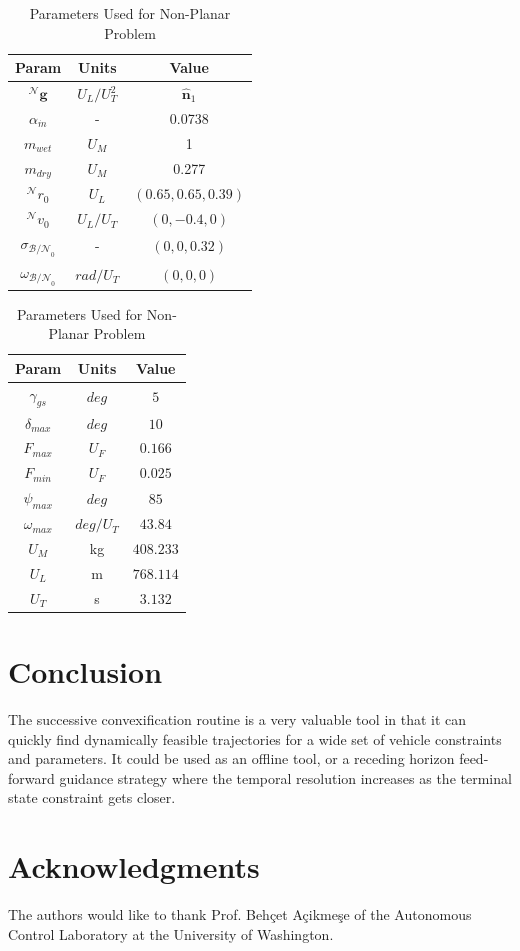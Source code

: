 \documentclass[conf]{new-aiaa}
\begin{document}
\begin{table}[ht]
  \caption{Parameters Used for Non-Planar Problem}
  \centering 
  \begin{tabular}{c c c} 
    \hline\hline
    Param & Units & Value \\ [0.5ex] 
    \hline 
    $^\mathcal{N}\mathbf{g}$ 		& $U_L/U_T^2$ 	& $\hat{\mathbf{n}}_1$  \\ 
    $\alpha_{\dot{m}}$ 				& - 			& 0.0738  \\
    $m_{wet}$ 						& $U_M$ 		& 1  \\
    $m_{dry}$ 						& $U_M$ 		& 0.277  \\
    $^\mathcal{N}r_{0}$ 			& $U_L$ 		& $(0.65,0.65,0.39)$  \\
    $^\mathcal{N}v_{0}$ 			& $U_L/U_T$	 	& $(0,-0.4,0)$  \\
    $\sigma_{\mathcal{B/N}_0}$ 		& - 			& $(0,0,0.32)$  \\
    $\omega_{\mathcal{B/N}_0}$ 		& $rad/U_T$ 	& $(0,0,0)$ \\[1ex] 
    \hline
    \end{tabular}
    \begin{tabular}{c c c} 
    \hline\hline
    Param & Units & Value \\ [0.5ex] 
    \hline 
    $\gamma_{gs}$ 					& $deg$ 		& $5$  \\ 
    $\delta_{max}$	 				& $deg$ 		& $10$  \\
    $F_{max}$ 						& $U_F$ 		& $0.166$ \\
    $F_{min}$ 						& $U_F$ 		& $0.025$  \\
    $\psi_{max}$ 					& $deg$ 		& $85$  \\
    $\omega_{max}$ 					& $deg/U_T$	 	& $43.84$  \\
    $U_M$ 							& kg 			& $408.233$  \\
    $U_L$					 		& m			 	& $768.114$ \\
    $U_T$					 		& s			 	& $3.132$ \\[1ex] 
    \hline
  \end{tabular}
  \label{table:tablenplanar}
\end{table}









\clearpage
\section{Conclusion}
The successive convexification routine is a very valuable tool in that it can quickly find dynamically feasible trajectories for a wide set of vehicle constraints and parameters. It could be used as an offline tool, or a receding horizon feed-forward guidance strategy where the temporal resolution increases as the terminal state constraint gets closer. 

\section*{Acknowledgments}
The authors would like to thank Prof. Behçet Açikmeşe of the Autonomous Control Laboratory at the University of Washington.

\begin{singlespace} 

\end{singlespace}
\end{document}
